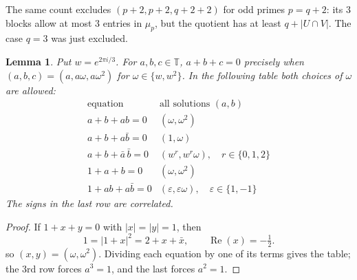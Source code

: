 \documentclass[11pt,a4paper]{article}
\newtheorem{lemma}[theorem]{Lemma}
\theoremstyle{plain}
\theoremstyle{definition}
\numberwithin{equation}{section}
\begin{document}
The same count excludes $(p+2,p+2,q+2+2)$ for odd primes $p=q+2$: its $3$ blocks allow at most $3$ entries in $\mu_p$, but the quotient has at least $q+|U\cap V|$. The case $q=3$ was just excluded.

\begin{lemma}\label{pre:phase}
Put $w=e^{2\pi i/3}$. For $a,b,c\in\mathbb T$, $a+b+c=0$ precisely when $(a,b,c)=(a,a\omega,a\omega^2)$ for $\omega\in\{w,w^2\}$. In the following table both choices of $\omega$ are allowed:
$$
\begin{array}{c|l}
\text{equation}&\text{all solutions }(a,b)\\ \hline
 a+b+ab=0&(\omega,\omega^2)\\
 a+b+a\bar{b}=0&(1,\omega)\\
 a+b+\bar{a}\,\bar{b}=0&(w^r,w^r\omega),\quad r\in\{0,1,2\}\\
 1+a+b=0&(\omega,\omega^2)\\
 1+ab+a\bar{b}=0&(\varepsilon,\varepsilon\omega),
                         \quad\varepsilon\in\{1,-1\}
\end{array}
$$
The signs in the last row are correlated.
\end{lemma}
\begin{proof}
If $1+x+y=0$ with $|x|=|y|=1$, then
$$
 1=|1+x|^2=2+x+\bar{x},
 \qquad \operatorname{Re}(x)=-\tfrac12.
$$
so $(x,y)=(\omega,\omega^2)$. Dividing each equation by one of its terms gives the table; the $3$rd row forces $a^3=1$, and the last forces $a^2=1$.
\end{proof}
\end{document}
